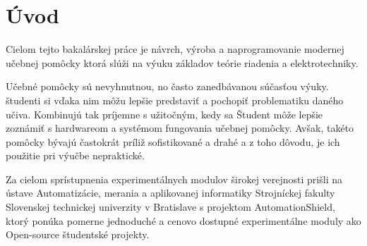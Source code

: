 \chapter*{Úvod}
\label{UVOD}



Cielom tejto bakalárskej práce je návrch, výroba a naprogramovanie modernej učebnej pomôcky ktorá slúži na výuku základov teórie riadenia a elektrotechniky.

Učebné pomôcky sú nevyhnutnou, no často zanedbávanou súčasťou výuky. študenti si vďaka nim môžu lepšie predstaviť a pochopiť problematiku daného učiva. Kombinujú tak príjemne s užitočným, kedy sa Študent môže lepšie zoznámiť s hardwareom a systémom fungovania učebnej pomôcky.
Avšak, takéto pomôcky bývajú častokrát príliž sofistikované a drahé a z toho dôvodu, je ich použitie pri výučbe nepraktické. 

Za cielom sprístupnenia experimentálnych modulov širokej verejnosti prišli na ústave Automatizácie, merania a aplikovanej informatiky
Strojníckej fakulty Slovenskej technickej univerzity v Bratislave s projektom AutomationShield, ktorý ponúka pomerne jednoduché a cenovo dostupné experimentálne moduly ako Open-source študentské projekty.  